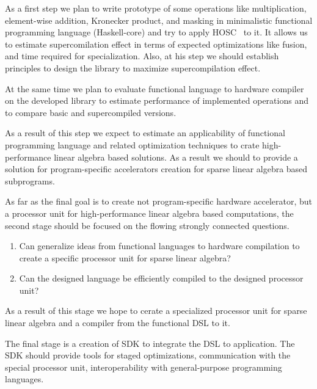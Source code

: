 \documentclass[10pt,conference]{IEEEtran}
\begin{document}
As a first step we plan to write prototype of some operations like multiplication, element-wise addition, Kronecker product, and masking in minimalistic functional programming language (Haskell-core) and try to apply HOSC~\cite{!!!} to it. 
It allows us to estimate supercomilation effect in terms of expected optimizations like fusion, and time required for specialization. 
Also, at his step we should establish principles to design the library to maximize supercompilation effect.

At the same time we plan to evaluate functional language to hardware compiler~\cite{funcHLS} on the developed library to estimate performance of implemented operations and to compare basic and supercompiled versions.

As a result of this step we expect to estimate an applicability of functional programming language and related optimization techniques to crate high-performance linear algebra based solutions. 
As a result we should to provide a solution for program-specific accelerators creation for sparse linear algebra based subprograms. 

As far as the final goal is to create not program-specific hardware accelerator, but a processor unit for high-performance linear algebra based computations, the second stage should be focused on the flowing strongly connected questions. 
\begin{enumerate}  
  \item Can generalize ideas from functional languages to hardware compilation to create a specific processor unit for sparse linear algebra?
  \item Can the designed language be efficiently compiled to the designed processor unit?
\end{enumerate}

As a result of this stage we hope to cerate a specialized processor unit for sparse linear algebra and a compiler from the functional DSL to it.


The final stage is a creation of SDK to integrate the DSL to application. 
The SDK should provide tools for staged optimizations, communication with the special processor unit, interoperability with general-purpose programming languages. 






\end{document}
